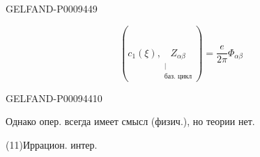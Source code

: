\begin{GelfandAdjacentEvidence}{GELFAND-P000944}{9}


\begin{equation*}
 \left(c_1(\xi),\underset{\substack{\vert\\\text{баз. цикл}}}{Z_{\alpha\beta}}\right)
 =\frac e{2\pi}\Phi_{\alpha\beta}
 \tag{10}
\end{equation*}
\end{GelfandAdjacentEvidence}
\begin{GelfandAdjacentEvidence}{GELFAND-P000944}{10}


Однако опер. всегда имеет смысл (физич.), но теории нет.

(11)\quad Иррацион. интер. 
\end{GelfandAdjacentEvidence}


